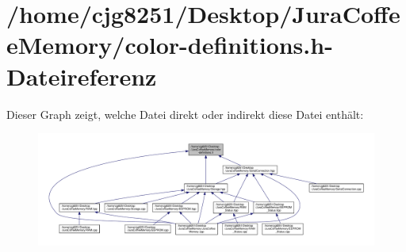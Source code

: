 \section{/home/cjg8251/\+Desktop/\+Jura\+Coffee\+Memory/color-\/definitions.h-\/\+Dateireferenz}
\label{color-definitions_8h}
Dieser Graph zeigt, welche Datei direkt oder indirekt diese Datei enthält\+:\nopagebreak
\begin{figure}[H]
\begin{center}
\leavevmode
\includegraphics[width=350pt]{color-definitions_8h__dep__incl}
\end{center}
\end{figure}
